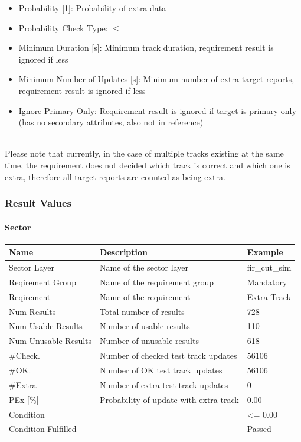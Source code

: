 \begin{itemize}  
\item Probability [1]: Probability of extra data
\item Probability Check Type: $\leq$
\item Minimum Duration [s]: Minimum track duration, requirement result is ignored if less
\item Minimum Number of Updates [s]: Minimum number of extra target reports, requirement result is ignored if less
\item Ignore Primary Only: Requirement result is ignored if target is primary only (has no secondary attributes, also not in reference)
\end{itemize}
\ \\

Please note that currently, in the case of multiple tracks existing at the same time, the requirement does not decided which track is correct and which one is extra, therefore all target reports are counted as being extra. \\

\subsubsection{Result Values}

\paragraph{Sector}

\begin{center}
 \begin{table}[H]
  \begin{tabularx}{\textwidth}{ | l | X |  l | }
    \hline
    \textbf{Name} & \textbf{Description} & \textbf{Example} \\ \hline
    Sector Layer & Name of the sector layer & fir\_cut\_sim \\ \hline
    Reqirement Group & Name of the requirement group & Mandatory \\ \hline
    Reqirement & Name of the requirement & Extra Track \\ \hline
    Num Results & Total number of results & 728 \\ \hline
    Num Usable Results & Number of usable results & 110 \\ \hline
    Num Unusable Results & Number of unusable results & 618 \\ \hline
    \#Check. & Number of checked test track updates & 56106 \\ \hline
    \#OK. & Number of OK test track updates & 56106 \\ \hline
    \#Extra & Number of extra test track updates & 0 \\ \hline
    PEx [\%] & Probability of update with extra track & 0.00 \\ \hline
    Condition &  & <= 0.00 \\ \hline
    Condition Fulfilled &  & Passed \\ \hline
\end{tabularx}
\end{table}
\end{center}

